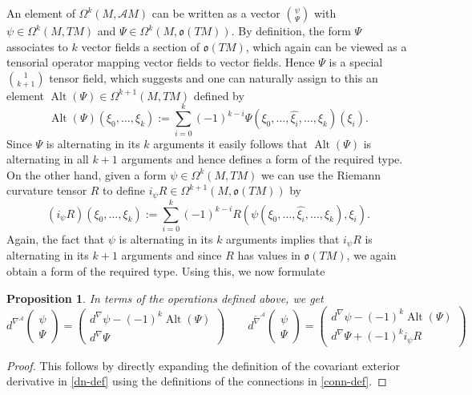 \documentclass[12pt,a4paper]{amsart}
\def\frak{\mathfrak}
\def\Cal{\mathcal}
\newcommand{\ps}{\psi}
\newcommand{\Om}{\Omega}
\newcommand{\Alt}{\operatorname{Alt}}
\newcommand{\tn}{\widetilde{\nabla}}
\newcounter{theorem}
\numberwithin{theorem}{section}
\numberwithin{equation}{section}
\newtheorem{prop}[theorem]{Proposition}
\theoremstyle{definition}
\theoremstyle{remark}
\begin{document}
An element of $\Om^k(M,\Cal AM)$ can be written as a vector $\binom{\ps}{\Psi}$ with
$\ps\in\Om^k(M,TM)$ and $\Psi\in\Om^k(M,\frak o(TM))$. By definition, the form $\Psi$
associates to $k$ vector fields a section of $\frak o(TM)$, which again can be viewed
as a tensorial operator mapping vector fields to vector fields. Hence $\Psi$ is a
special $\binom1{k+1}$ tensor field, which suggests and one can naturally assign to
this an element $\Alt(\Psi)\in\Om^{k+1}(M,TM)$ defined by
\begin{equation}\label{Alt-def}
  \Alt(\Psi)(\xi_0,\dots,\xi_k):=
  \textstyle\sum_{i=0}^k(-1)^{k-i}\Psi(\xi_0,\dots,\widehat{\xi_i},\dots,\xi_k)(\xi_i). 
\end{equation}
Since $\Psi$ is alternating in its $k$ arguments it easily follows that $\Alt(\Psi)$
is alternating in all $k+1$ arguments and hence defines a form of the required
type. On the other hand, given a form $\ps\in\Om^k(M,TM)$ we can use the Riemann
curvature tensor $R$ to define $i_\ps R\in\Om^{k+1}(M,\frak o(TM))$ by
\begin{equation}\label{i-def}
(i_\ps R)(\xi_0,\dots,\xi_k):=
  \textstyle\sum_{i=0}^k(-1)^{k-i}R(\psi(\xi_0,\dots,\widehat{\xi_i},\dots,\xi_k),\xi_i). 
\end{equation}
Again, the fact that $\psi$ is alternating in its $k$ arguments implies that
$i_{\psi}R$ is alternating in its $k+1$ arguments and since $R$ has values in $\frak
o(TM)$, we again obtain a form of the required type. Using this, we now formulate

\begin{prop}\label{prop2.3}
  In terms of the operations defined above, we get
  $$
  d^{\nabla^{\Cal A}}\begin{pmatrix}\psi\\\Psi
  \end{pmatrix}=\begin{pmatrix} d^{\nabla}\psi-(-1)^k\Alt(\Psi) \\ d^{\nabla}\Psi
  \end{pmatrix} \qquad  d^{\tn^{\Cal A}}\begin{pmatrix}\psi\\\Psi
  \end{pmatrix}=\begin{pmatrix} d^{\nabla}\psi-(-1)^k\Alt(\Psi) \\ d^{\nabla}\Psi + (-1)^k 
  i_{\psi}R \end{pmatrix}
  $$
\end{prop}
\begin{proof}
This follows by directly expanding the definition of the covariant exterior derivative
in \eqref{dn-def} using the definitions of the connections in \eqref{conn-def}. 
\end{proof}
\end{document}
